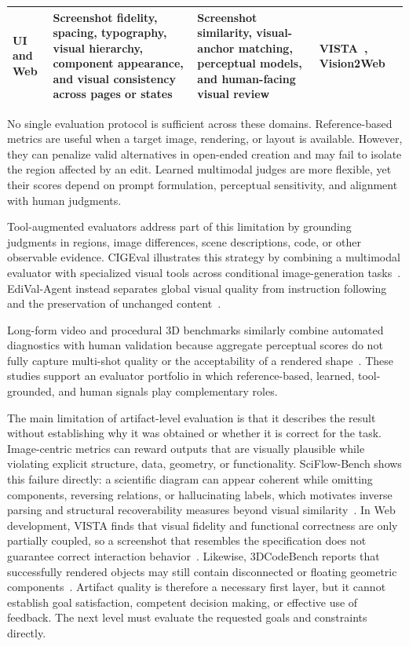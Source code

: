 \begin{table}[t]
\begin{tabularx}{\textwidth}{@{}p{}XXX@{}}
    UI and Web & Screenshot fidelity, spacing, typography, visual hierarchy, component appearance, and visual consistency across pages or states & Screenshot similarity, visual-anchor matching, perceptual models, and human-facing visual review & VISTA~\cite{avg260526144}, Vision2Web~\cite{avg260326648} \\
    \bottomrule
  \end{tabularx}
\end{table}
\FloatBarrier

No single evaluation protocol is sufficient across these domains. Reference-based metrics are useful when a target image, rendering, or layout is available. However, they can penalize valid alternatives in open-ended creation and may fail to isolate the region affected by an edit. Learned multimodal judges are more flexible, yet their scores depend on prompt formulation, perceptual sensitivity, and alignment with human judgments.

Tool-augmented evaluators address part of this limitation by grounding judgments in regions, image differences, scene descriptions, code, or other observable evidence. CIGEval illustrates this strategy by combining a multimodal evaluator with specialized visual tools across conditional image-generation tasks~\cite{avg250407046}. EdiVal-Agent instead separates global visual quality from instruction following and the preservation of unchanged content~\cite{avg250913399}.

Long-form video and procedural 3D benchmarks similarly combine automated diagnostics with human validation because aggregate perceptual scores do not fully capture multi-shot quality or the acceptability of a rendered shape~\cite{avg260530090,avg260601057}. These studies support an evaluator portfolio in which reference-based, learned, tool-grounded, and human signals play complementary roles.

The main limitation of artifact-level evaluation is that it describes the result without establishing why it was obtained or whether it is correct for the task. Image-centric metrics can reward outputs that are visually plausible while violating explicit structure, data, geometry, or functionality. SciFlow-Bench shows this failure directly: a scientific diagram can appear coherent while omitting components, reversing relations, or hallucinating labels, which motivates inverse parsing and structural recoverability measures beyond visual similarity~\cite{avg260209809}. In Web development, VISTA finds that visual fidelity and functional correctness are only partially coupled, so a screenshot that resembles the specification does not guarantee correct interaction behavior~\cite{avg260526144}. Likewise, 3DCodeBench reports that successfully rendered objects may still contain disconnected or floating geometric components~\cite{avg260601057}. Artifact quality is therefore a necessary first layer, but it cannot establish goal satisfaction, competent decision making, or effective use of feedback. The next level must evaluate the requested goals and constraints directly.

